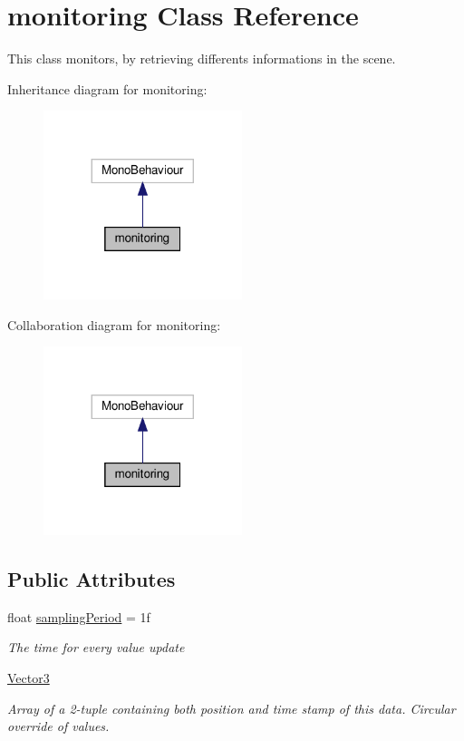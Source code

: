 \hypertarget{classmonitoring}{}\section{monitoring Class Reference}
\label{classmonitoring}


This class monitors, by retrieving differents informations in the scene.  




Inheritance diagram for monitoring\+:\nopagebreak
\begin{figure}[H]
\begin{center}
\leavevmode
\includegraphics[width=164pt]{classmonitoring__inherit__graph}
\end{center}
\end{figure}


Collaboration diagram for monitoring\+:\nopagebreak
\begin{figure}[H]
\begin{center}
\leavevmode
\includegraphics[width=164pt]{classmonitoring__coll__graph}
\end{center}
\end{figure}
\subsection*{Public Attributes}
\begin{DoxyCompactItemize}
\item 
float \hyperlink{classmonitoring_a20213a8bca2c7713ea994a8f0625e810}{sampling\+Period} = 1f
\begin{DoxyCompactList}\small\item\em The time for every value update\end{DoxyCompactList}\item 
\hyperlink{classmonitoring_a4a225f8529921b2f6b38156cf3b296cf}{Vector3}
\begin{DoxyCompactList}\small\item\em Array of a 2-\/tuple containing both position and time stamp of this data. Circular override of values.\end{DoxyCompactList}\end{DoxyCompactItemize}
